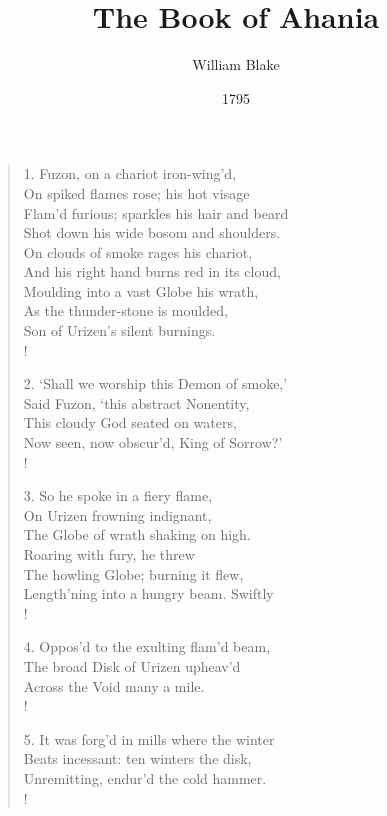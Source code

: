 \documentclass[9pt]{extarticle}
\title{The Book of Ahania}
\author{William Blake}
\date{1795}
\begin{document}
\maketitle

		
\begin{verse}
	\begin{altverse} 
		
		1. Fuzon, on a chariot iron-wing'd,\\
		On spiked flames rose; his hot visage\\
		Flam'd furious; sparkles his hair and beard\\
		Shot down his wide bosom and shoulders.\\
		On clouds of smoke rages his chariot,\\
		And his right hand burns red in its cloud,\\
		Moulding into a vast Globe his wrath,\\
		As the thunder-stone is moulded,\\
		Son of Urizen's silent burnings.\\!
		
		2. `Shall we worship this Demon of smoke,'\\
		Said Fuzon, `this abstract Nonentity,\\
		This cloudy God seated on waters,\\
		Now seen, now obscur'd, King of Sorrow?'\\!
		
		3. So he spoke in a fiery flame,\\
		On Urizen frowning indignant,\\
		The Globe of wrath shaking on high.\\
		Roaring with fury, he threw\\
		The howling Globe; burning it flew,\\
		Length'ning into a hungry beam. Swiftly\\!
		
		4. Oppos'd to the exulting flam'd beam,\\
		The broad Disk of Urizen upheav'd\\
		Across the Void many a mile.\\!
		
		5. It was forg'd in mills where the winter\\
		Beats incessant: ten winters the disk,\\
		Unremitting, endur'd the cold hammer.\\!
		

\end{altverse}
\end{verse}
\end{document}
